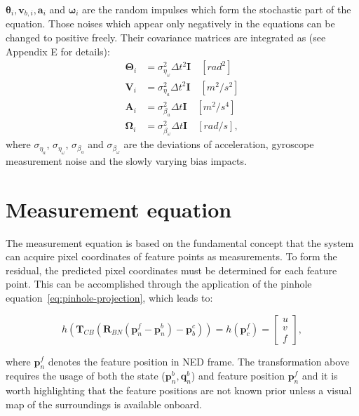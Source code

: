 $\boldsymbol{\theta}_i,\mathbf{v}_{b,i},\mathbf{a}_i$ and $\boldsymbol{\omega}_i$ are the random impulses which form the stochastic part of the equation. Those noises which appear only negatively in the equations can be changed to positive freely. Their covariance matrices are integrated as (see~\cite{quaternion-eskf} Appendix E for details):
\begin{equation}
\begin{aligned}
    \boldsymbol{\Theta}_i&=\sigma_{\eta_\omega}^2\Delta t^2\mathbf{I} \quad [rad^2] \\
    \mathbf{V}_i&=\sigma_{\eta_a}^2\Delta t^2\mathbf{I} \quad [m^2/s^2]\\
    \mathbf{A}_i&=\sigma_{\beta_a}^2\Delta t\mathbf{I} \quad [m^2/s^4]\\
    \boldsymbol{\Omega}_i&=\sigma_{\beta_\omega}^2\Delta t\mathbf{I} \quad [rad/s],
\end{aligned}\label{eq:noises}
\end{equation}
where $\sigma_{\eta_a}$, $\sigma_{\eta_\omega}$, $\sigma_{\beta_a}$ and $\sigma_{\beta_\omega}$ are the deviations of acceleration, gyroscope measurement noise and the slowly varying bias impacts.

\section{Measurement equation}

The measurement equation is based on the fundamental concept that the system can acquire pixel coordinates of feature points as measurements. To form the residual, the predicted pixel coordinates must be determined for each feature point. This can be accomplished through the application of the pinhole equation~\eqref{eq:pinhole-projection}, which leads to:

\begin{equation}
    h(\mathbf{T}_{CB}(\mathbf{R}_{BN}(\mathbf{p}_n^f-\mathbf{p}_n^b)-\mathbf{p}_b^c))=
    h(\mathbf{p}_c^f)=
    \begin{bmatrix}
        u \\ v \\ f
    \end{bmatrix}, 
\end{equation}

where $\mathbf{p}_n^f$ denotes the feature position in NED frame. The transformation above requires the usage of both the state ($\mathbf{p}_n^b, \mathbf{q}_n^b$) and feature position $\mathbf{p}_n^f$ and it is worth highlighting that the feature positions are not known prior unless a visual map of the surroundings is available onboard.

